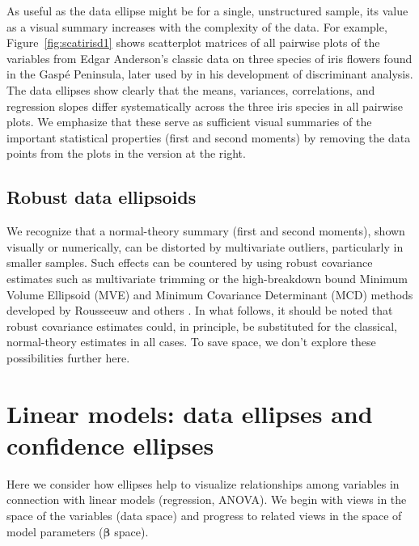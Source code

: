 \documentclass[11pt]{article}%
\newcommand*{\figref}[1]{Figure~\ref{#1}}
\renewcommand*{\vec}[1]{\ensuremath{\bm{#1}}}
\begin{document}
As useful as the data ellipse might be for a single, unstructured
sample, its value as a visual summary increases
with the complexity of the data.
For example, \figref{fig:scatirisd1} shows  scatterplot matrices
of all pairwise plots of the variables from Edgar Anderson's \citeyear{Anderson:35}
classic
data on three species of iris flowers found in the Gasp\'{e} Peninsula,
later used by \citet{Fisher:36} in his development of discriminant analysis.
The data ellipses show clearly that the means, variances, correlations,
and regression slopes differ systematically across the three iris species
in all pairwise plots.
We emphasize that these serve as sufficient visual summaries of the important
statistical properties (first and second moments) by removing the data points
from the plots in the version at the right.

\subsection{Robust data ellipsoids}

We recognize that a normal-theory summary (first and second moments),
shown visually or numerically, can be distorted
by multivariate outliers, particularly in smaller samples.
Such effects can be countered by using
robust covariance
estimates such as multivariate trimming \citep{GnanadesikanKettenring:72}
or the high-breakdown bound Minimum Volume Ellipsoid (MVE) and
Minimum Covariance Determinant (MCD) methods
developed by Rousseeuw and others
\citep{RousseeuwLeroy:87,RousseeuwVanDriessen:99}.
In what follows, it should be noted that
robust covariance estimates could, in principle, be substituted
for the classical, normal-theory estimates in all cases.
To save space, we don't explore these possibilities further here.



\section{Linear models: data ellipses and confidence ellipses}

Here we consider how ellipses help to visualize relationships among variables
in connection with linear models (regression, ANOVA).
We begin with views in the space of the variables (data space)
and progress to related views in the space of model parameters
($\vec{\beta}$ space).

\end{document}
